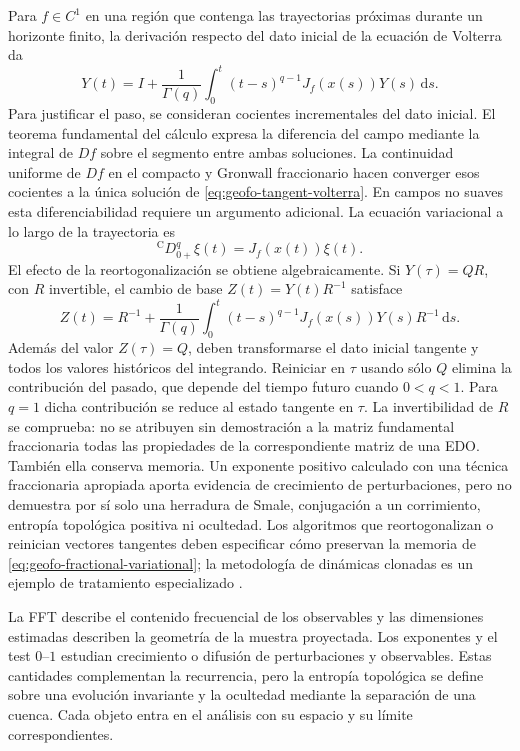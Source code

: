 Para $f\in C^1$ en una región que contenga las trayectorias próximas
durante un horizonte finito, la derivación respecto del dato inicial de
la ecuación de Volterra da
\begin{equation}
 Y(t)=I+\frac1{\Gamma(q)}\int_0^t(t-s)^{q-1}J_f(x(s))Y(s)\,\mathrm ds.
 \label{eq:geofo-tangent-volterra}
\end{equation}
Para justificar el paso, se consideran cocientes incrementales del dato
inicial. El teorema fundamental del cálculo expresa la diferencia del
campo mediante la integral de $Df$ sobre el segmento entre ambas
soluciones. La continuidad uniforme de $Df$ en el compacto y Gronwall
fraccionario hacen converger esos cocientes a la única solución de
\cref{eq:geofo-tangent-volterra}. En campos no suaves esta diferenciabilidad
requiere un argumento adicional. La ecuación variacional a lo largo de
la trayectoria es
\begin{equation}
 {}^{\mathrm C}D_{0+}^{q}\xi(t)=J_f(x(t))\xi(t).
\label{eq:geofo-fractional-variational}
\end{equation}
El efecto de la reortogonalización se obtiene algebraicamente. Si
$Y(\tau)=QR$, con $R$ invertible, el cambio de base $Z(t)=Y(t)R^{-1}$
satisface
\[
 Z(t)=R^{-1}+\frac1{\Gamma(q)}\int_0^t(t-s)^{q-1}
 J_f(x(s))Y(s)R^{-1}\,\mathrm ds.
\]
Además del valor $Z(\tau)=Q$, deben transformarse el dato inicial tangente
y todos los valores históricos del integrando. Reiniciar en $\tau$ usando
sólo $Q$ elimina la contribución del pasado, que depende del tiempo futuro
cuando $0<q<1$. Para $q=1$ dicha contribución se reduce al estado tangente
en $\tau$. La invertibilidad de $R$ se comprueba: no se atribuyen sin
demostración a la matriz fundamental fraccionaria todas las propiedades
de la correspondiente matriz de una EDO.
También ella conserva memoria. Un exponente positivo calculado con una técnica
fraccionaria apropiada aporta evidencia de crecimiento de perturbaciones, pero
no demuestra por sí solo una herradura de Smale, conjugación a un corrimiento,
entropía topológica positiva ni ocultedad. Los algoritmos que reortogonalizan o
reinician vectores tangentes deben especificar cómo preservan la memoria de
\cref{eq:geofo-fractional-variational}; la metodología de dinámicas clonadas es
un ejemplo de tratamiento especializado \cite{fischer2020}.

La FFT describe el contenido frecuencial de los observables y las
dimensiones estimadas describen la geometría de la muestra proyectada.
Los exponentes y el test \(0\)--\(1\) estudian crecimiento o difusión de
perturbaciones y observables. Estas cantidades complementan la recurrencia,
pero la entropía topológica se define sobre una evolución invariante y la
ocultedad mediante la separación de una cuenca. Cada objeto entra en el
análisis con su espacio y su límite correspondientes.

